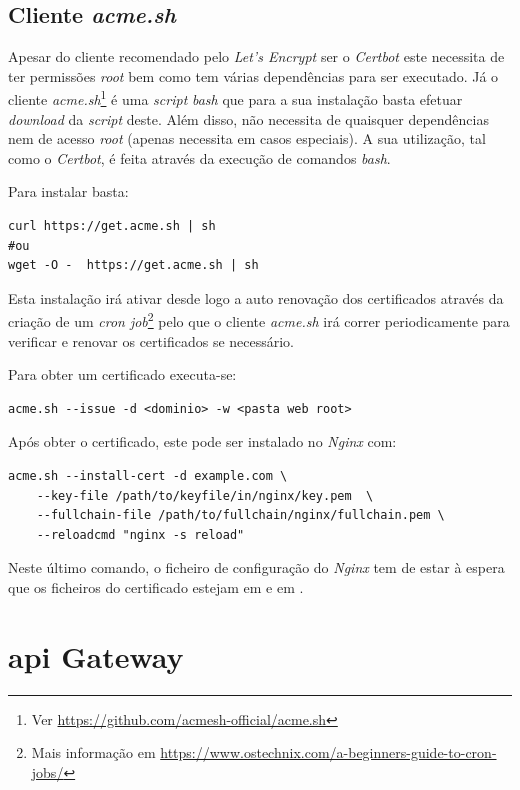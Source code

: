 \subsection{Cliente \textit{acme.sh}}
Apesar do cliente recomendado pelo \textit{Let's Encrypt} ser o \textit{Certbot} este necessita de ter permissões \textit{root} bem como tem várias dependências para ser executado. Já o cliente \textit{acme.sh}\footnote{Ver \url{https://github.com/acmesh-official/acme.sh}} é uma \textit{script} \textit{bash} que para a sua instalação basta efetuar \textit{download} da \textit{script} deste. Além disso, não necessita de quaisquer dependências nem de acesso \textit{root} (apenas necessita em casos especiais). A sua utilização, tal como o \textit{Certbot}, é feita através da execução de comandos \textit{bash}.

Para instalar basta:
\begin{verbatim}
curl https://get.acme.sh | sh
#ou
wget -O -  https://get.acme.sh | sh
\end{verbatim}

Esta instalação irá ativar desde logo a auto renovação dos certificados através da criação de um \textit{cron job}\footnote{Mais informação em \url{https://www.ostechnix.com/a-beginners-guide-to-cron-jobs/}} pelo que o cliente \textit{acme.sh} irá correr periodicamente para verificar e renovar os certificados se necessário.

Para obter um certificado executa-se:
\begin{verbatim}
acme.sh --issue -d <dominio> -w <pasta web root>
\end{verbatim}

Após obter o certificado, este pode ser instalado no \textit{Nginx} com:
\begin{verbatim}
acme.sh --install-cert -d example.com \
    --key-file /path/to/keyfile/in/nginx/key.pem  \
    --fullchain-file /path/to/fullchain/nginx/fullchain.pem \
    --reloadcmd "nginx -s reload"
\end{verbatim}

Neste último comando, o ficheiro de configuração do \textit{Nginx} tem de estar à espera que os ficheiros do certificado estejam em  e em .

\section{\acrshort{api} Gateway}\label{sec:api_gateway}

